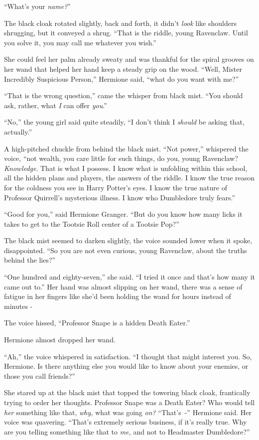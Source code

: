 ``What's your \emph{name?}''

The black cloak rotated slightly, back and forth, it didn't \emph{look} like shoulders shrugging, but it conveyed a shrug. ``That is the riddle, young Ravenclaw. Until you solve it, you may call me whatever you wish.''

She could feel her palm already sweaty and was thankful for the spiral grooves on her wand that helped her hand keep a steady grip on the wood. ``Well, Mister Incredibly Suspicious Person,'' Hermione said, ``what do you want with me?''

``That is the wrong question,'' came the whisper from black mist. ``You should ask, rather, what \emph{I} can offer \emph{you}.''

``No,'' the young girl said quite steadily, ``I don't think I \emph{should} be asking that, actually.''

A high-pitched chuckle from behind the black mist. ``Not power,'' whispered the voice, ``not wealth, you care little for such things, do you, young Ravenclaw? \emph{Knowledge}. That is what I possess. I know what is unfolding within this school, all the hidden plans and players, the answers of the riddle. I know the true reason for the coldness you see in Harry Potter's eyes. I know the true nature of Professor Quirrell's mysterious illness. I know who Dumbledore truly fears.''

``Good for you,'' said Hermione Granger. ``But do you know how many licks it takes to get to the Tootsie Roll center of a Tootsie Pop?''

The black mist seemed to darken slightly, the voice sounded lower when it spoke, disappointed. ``So you are not even curious, young Ravenclaw, about the truths behind the lies?''

``One hundred and eighty-seven,'' she said. ``I tried it once and that's how many it came out to.'' Her hand was almost slipping on her wand, there was a sense of fatigue in her fingers like she'd been holding the wand for hours instead of minutes -

The voice hissed, ``Professor Snape is a hidden Death Eater.''

Hermione almost dropped her wand.

``Ah,'' the voice whispered in satisfaction. ``I thought that might interest you. So, Hermione. Is there anything else you would like to know about your enemies, or those you call friends?''

She stared up at the black mist that topped the towering black cloak, frantically trying to order her thoughts. Professor Snape was a Death Eater? Who would tell \emph{her} something like that, \emph{why,} what was going \emph{on?} ``That's~-'' Hermione said. Her voice was quavering. ``That's extremely serious business, if it's really true. Why are you telling something like that to \emph{me,} and not to Headmaster Dumbledore?''

